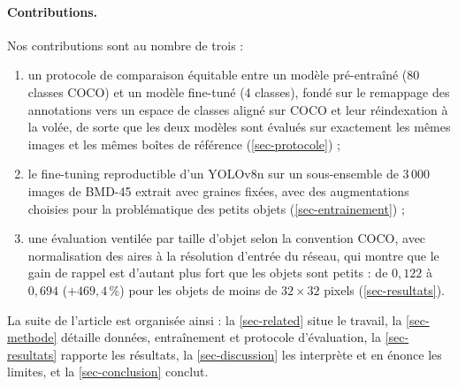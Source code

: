 \paragraph{Contributions.}
Nos contributions sont au nombre de trois :
\begin{enumerate}
  \item un protocole de comparaison équitable entre un modèle
        pré-entraîné (80 classes COCO) et un modèle fine-tuné
        (4 classes), fondé sur le remappage des annotations vers un
        espace de classes aligné sur COCO et leur réindexation à la
        volée, de sorte que les deux modèles sont évalués sur
        exactement les mêmes images et les mêmes boîtes de référence
        (\cref{sec-protocole}) ;
  \item le fine-tuning reproductible d'un YOLOv8n sur un sous-ensemble
        de 3\,000 images de BMD-45 extrait avec graines fixées, avec des
        augmentations choisies pour la problématique des petits objets
        (\cref{sec-entrainement}) ;
  \item une évaluation ventilée par taille d'objet selon la convention
        COCO, avec normalisation des aires à la résolution d'entrée du
        réseau, qui montre que le gain de rappel est d'autant plus fort
        que les objets sont petits : de $0{,}122$ à $0{,}694$
        ($+469{,}4\,\%$) pour les objets de moins de $32 \times 32$
        pixels (\cref{sec-resultats}).
\end{enumerate}

La suite de l'article est organisée ainsi : la \cref{sec-related} situe
le travail, la \cref{sec-methode} détaille données, entraînement et
protocole d'évaluation, la \cref{sec-resultats} rapporte les résultats,
la \cref{sec-discussion} les interprète et en énonce les limites, et la
\cref{sec-conclusion} conclut.
